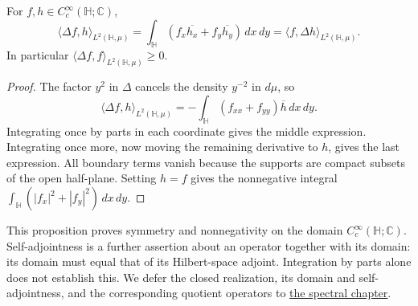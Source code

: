 \begin{proposition}\label{hyperbolic.laplacian-green}
For $f,h\in C_c^\infty(\mathbb H;\mathbb C)$,
\[
 \langle\Delta f,h\rangle_{L^2(\mathbb H,\mu)}
 =\int_{\mathbb H}(f_x\overline{h_x}+f_y\overline{h_y})\,dx\,dy
 =\langle f,\Delta h\rangle_{L^2(\mathbb H,\mu)}.
\]
In particular $\langle\Delta f,f\rangle_{L^2(\mathbb H,\mu)}\geq0$.
\end{proposition}

\begin{proof}
The factor $y^2$ in $\Delta$ cancels the density $y^{-2}$ in $d\mu$, so
\[
 \langle\Delta f,h\rangle_{L^2(\mathbb H,\mu)}
 =-\int_{\mathbb H}(f_{xx}+f_{yy})\overline h\,dx\,dy.
\]
Integrating once by parts in each coordinate gives the middle expression. Integrating once more, now moving the remaining derivative to $h$, gives the last expression. All boundary terms vanish because the supports are compact subsets of the open half-plane. Setting $h=f$ gives the nonnegative integral $\int_{\mathbb H}(|f_x|^2+|f_y|^2)\,dx\,dy$.
\end{proof}

This proposition proves symmetry and nonnegativity on the domain $C_c^\infty(\mathbb H;\mathbb C)$. Self-adjointness is a further assertion about an operator together with its domain: its domain must equal that of its Hilbert-space adjoint. Integration by parts alone does not establish this. We defer the closed realization, its domain and self-adjointness, and the corresponding quotient operators to \hyperref[v1a-ch11]{the spectral chapter}.
